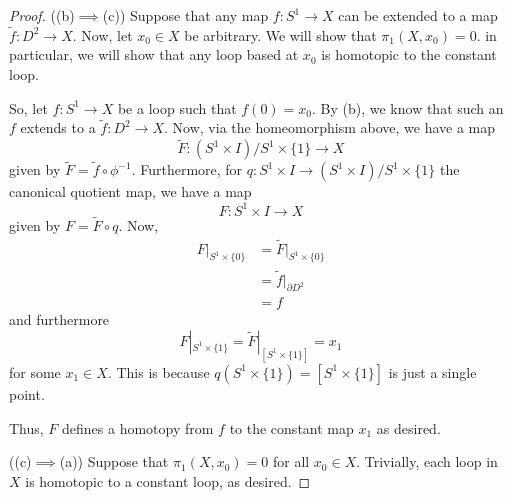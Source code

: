 \documentclass[fontsize=11pt]{scrartcl} %
\numberwithin{equation}{section} %
\numberwithin{figure}{section} %
\numberwithin{table}{section} %
\begin{document}
\begin{proof}
    ((b)$\implies$(c))
    Suppose that any map $f:S^1\to X$ can be extended to a map $\tilde{f}:D^2\to
    X$. Now, let $x_0\in X$ be arbitrary. We will show that $\pi_1(X,x_0)=0$. in
    particular, we will show that any loop based at $x_0$ is homotopic to the
    constant loop.

    So, let $f:S^1\to X$ be a loop such that $f(0) = x_0$. By (b), we know that
    such an $f$ extends to a $\tilde{f}:D^2\to X$. Now, via the homeomorphism
    above, we have a map 
    \[
        \tilde{F}:(S^1\times I)/{S^1\times \{1\}}\to X
    \]
    given by $\tilde{F} = \tilde{f}\circ\phi^{-1}$. Furthermore, for
    $q:S^1\times I\to (S^1\times I)/{S^1\times\{1\}}$ the canonical quotient
    map, we have a map
    \[
        F:S^1\times I\to X
    \]
    given by $F = \tilde{F}\circ q$. Now, 
    \[
        \begin{aligned}
            F|_{S^1\times\{0\}} &= \tilde{F}|_{S^1\times\{0\}}\\
            &= \tilde{f}|_{\partial D^2}\\
            &= f
        \end{aligned}
    \]
    and furthermore
    \[
        F|_{S^1\times\{1\}} = \tilde{F}|_{[S^1\times\{1\}]} = x_1
    \]
    for some $x_1\in X$. This is because $q(S^1\times\{1\}) = [S^1\times\{1\}]$
    is just a single point.

    Thus, $F$ defines a homotopy from $f$ to the constant map $x_1$ as desired.

    ((c)$\implies$(a))
    Suppose that $\pi_1(X,x_0)=0$ for all $x_0\in X$. Trivially, each loop in
    $X$ is homotopic to a constant loop, as desired.
\end{proof}

\newpage
\end{document}
